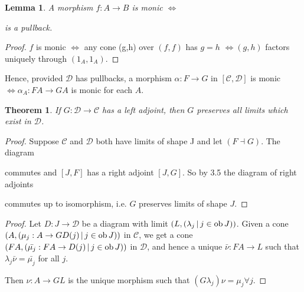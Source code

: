 \documentclass[a4paper]{article}
\newtheorem{lemma}[definition]{Lemma}
\newtheorem{theorem}[definition]{Theorem}
\numberwithin{definition}{section}
\newcommand*\ob[1]{\textnormal{ob}\,#1}
\begin{document}
\begin{lemma}
	A morphism $f: A \to B$ is monic $\iff$
	\begin{center}
	\end{center}
	is a pullback.
\end{lemma}
\begin{proof}
	$f$ is monic $\iff$ any cone (g,h) over $(f, f)$ has $g=h$
	$\iff (g, h)$ factors uniquely through $(1_A, 1_A)$.
\end{proof}

Hence, provided $\mathcal{D}$ has pullbacks,
a morphism $\alpha: F \to G$ in $[\mathcal{C}, \mathcal{D}]$
is monic $\iff \alpha_A: FA \to GA$ is monic for each $A$.

\begin{theorem}
	If $G: \mathcal{D} \to \mathcal{C}$ has a left adjoint,
	then $G$ preserves all limits which exist in $\mathcal{D}$.
\end{theorem}
\begin{proof}
	Suppose $\mathcal{C}$ and $\mathcal{D}$ both have limits of shape J and let $(F \dashv G)$.
	The diagram
	\begin{center}
	\end{center}
	commutes and $[J, F]$ has a right adjoint $[J, G]$.
	So by 3.5 the diagram of right adjoints
	\begin{center}
	\end{center}
	commutes up to isomorphism,
	i.e. $G$ preserves limits of shape $J$.
\end{proof}
\begin{proof}
	Let $D:J \to \mathcal{D}$ be a diagram with limit $(L, (\lambda_j \,|\, j \in \ob J))$.
	Given a cone $(A, (\mu_j: A \to GD(j) \,|\, j \in \ob J))$ in $\mathcal{C}$,
	we get a cone $(FA, (\bar{\mu_j} : FA \to D(j) \,|\, j \in \ob J))$ in $\mathcal{D}$,
	and hence a unique $\bar{\nu}:FA \to L$ such that $\lambda_j\bar{\nu} = \bar{\mu_j}$ for all $j$.
	
	Then $\nu: A \to GL$ is the unique morphism such that $(G\lambda_j)\nu = \mu_j \forall j$.
\end{proof}
\end{document}
